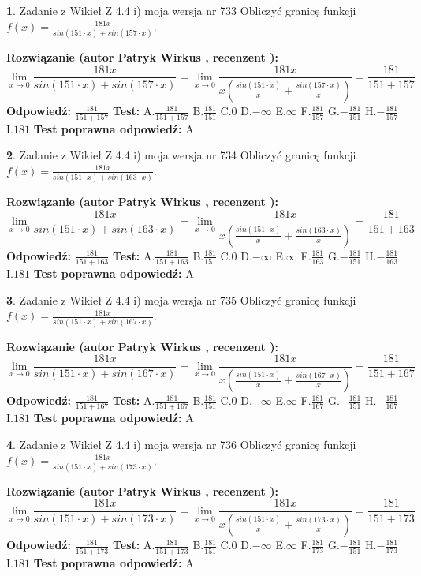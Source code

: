 \documentclass[12pt, a4paper]{article}
\theoremstyle{definition} %
\newtheorem{zad}{}
\newcommand{\zadStart}[1]{\begin{zad}#1\newline}
\newcommand{\zadStop}{\end{zad}}
\newcommand{\rozwStart}[2]{\noindent \textbf{Rozwiązanie (autor #1 , recenzent #2): }\newline}
\newcommand{\rozwStop}{\newline}
\newcommand{\odpStart}{\noindent \textbf{Odpowiedź:}\newline}
\newcommand{\odpStop}{\newline}
\newcommand{\testStart}{\noindent \textbf{Test:}\newline}
\newcommand{\testStop}{\newline}
\newcommand{\kluczStart}{\noindent \textbf{Test poprawna odpowiedź:}\newline}
\newcommand{\kluczStop}{\newline}
\begin{document}
\zadStart{Zadanie z Wikieł Z 4.4 i) moja wersja nr 733}
Obliczyć granicę funkcji $f(x)=\frac{181x}{sin(151\cdot x) +sin(157\cdot x)}$.
\zadStop
\rozwStart{Patryk Wirkus}{}
$$\lim\limits_{x\to 0}\frac{181x}{sin(151\cdot x) +sin(157\cdot x)}=\lim\limits_{x\to 0}\frac{181x}{x(\frac{sin(151\cdot x)}{x}+\frac{sin(157\cdot x)}{x})}=\frac{181}{151+157}$$
\rozwStop
\odpStart
$\frac{181}{151+157}$
\odpStop
\testStart
A.$\frac{181}{151+157}$
B.$\frac{181}{151}$
C.$0$
D.$-\infty$
E.$\infty$
F.$\frac{181}{157}$
G.$-\frac{181}{151}$
H.$-\frac{181}{157}$
I.$181$
\testStop
\kluczStart
A
\kluczStop



\zadStart{Zadanie z Wikieł Z 4.4 i) moja wersja nr 734}
Obliczyć granicę funkcji $f(x)=\frac{181x}{sin(151\cdot x) +sin(163\cdot x)}$.
\zadStop
\rozwStart{Patryk Wirkus}{}
$$\lim\limits_{x\to 0}\frac{181x}{sin(151\cdot x) +sin(163\cdot x)}=\lim\limits_{x\to 0}\frac{181x}{x(\frac{sin(151\cdot x)}{x}+\frac{sin(163\cdot x)}{x})}=\frac{181}{151+163}$$
\rozwStop
\odpStart
$\frac{181}{151+163}$
\odpStop
\testStart
A.$\frac{181}{151+163}$
B.$\frac{181}{151}$
C.$0$
D.$-\infty$
E.$\infty$
F.$\frac{181}{163}$
G.$-\frac{181}{151}$
H.$-\frac{181}{163}$
I.$181$
\testStop
\kluczStart
A
\kluczStop



\zadStart{Zadanie z Wikieł Z 4.4 i) moja wersja nr 735}
Obliczyć granicę funkcji $f(x)=\frac{181x}{sin(151\cdot x) +sin(167\cdot x)}$.
\zadStop
\rozwStart{Patryk Wirkus}{}
$$\lim\limits_{x\to 0}\frac{181x}{sin(151\cdot x) +sin(167\cdot x)}=\lim\limits_{x\to 0}\frac{181x}{x(\frac{sin(151\cdot x)}{x}+\frac{sin(167\cdot x)}{x})}=\frac{181}{151+167}$$
\rozwStop
\odpStart
$\frac{181}{151+167}$
\odpStop
\testStart
A.$\frac{181}{151+167}$
B.$\frac{181}{151}$
C.$0$
D.$-\infty$
E.$\infty$
F.$\frac{181}{167}$
G.$-\frac{181}{151}$
H.$-\frac{181}{167}$
I.$181$
\testStop
\kluczStart
A
\kluczStop



\zadStart{Zadanie z Wikieł Z 4.4 i) moja wersja nr 736}
Obliczyć granicę funkcji $f(x)=\frac{181x}{sin(151\cdot x) +sin(173\cdot x)}$.
\zadStop
\rozwStart{Patryk Wirkus}{}
$$\lim\limits_{x\to 0}\frac{181x}{sin(151\cdot x) +sin(173\cdot x)}=\lim\limits_{x\to 0}\frac{181x}{x(\frac{sin(151\cdot x)}{x}+\frac{sin(173\cdot x)}{x})}=\frac{181}{151+173}$$
\rozwStop
\odpStart
$\frac{181}{151+173}$
\odpStop
\testStart
A.$\frac{181}{151+173}$
B.$\frac{181}{151}$
C.$0$
D.$-\infty$
E.$\infty$
F.$\frac{181}{173}$
G.$-\frac{181}{151}$
H.$-\frac{181}{173}$
I.$181$
\testStop
\kluczStart
A
\kluczStop
\end{document}
